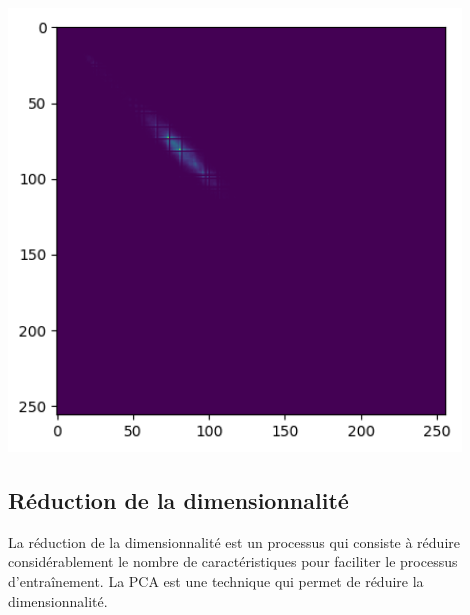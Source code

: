 \documentclass[12pt,twoside,letterpaper]{article}
\begin{document}
\begin{center}
    \includegraphics[width = 12cm]{glcm}
\end{center}

\subsection{Réduction de la dimensionnalité}
La réduction de la dimensionnalité est un processus qui consiste à réduire considérablement le nombre de caractéristiques pour faciliter le processus d’entraînement. La PCA est une technique qui permet de réduire la dimensionnalité.
\end{document}
